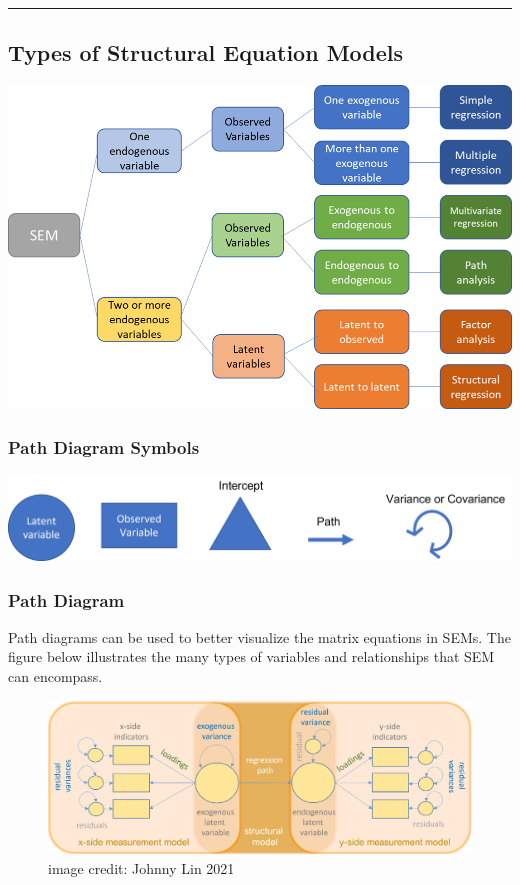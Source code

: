 \documentclass[
]{article}
\begin{document}
\begin{center}\rule{0.5\linewidth}{0.5pt}\end{center}

\hypertarget{types-of-structural-equation-models}{%
\subsection{Types of Structural Equation
Models}\label{types-of-structural-equation-models}}

\includegraphics{SEM Models.png}

\hypertarget{path-diagram-symbols}{%
\subsubsection{Path Diagram Symbols}\label{path-diagram-symbols}}

\includegraphics{Path.Diagram.Key.png}

\hypertarget{path-diagram}{%
\subsubsection{Path Diagram}\label{path-diagram}}

Path diagrams can be used to better visualize the matrix equations in
SEMs. The figure below illustrates the many types of variables and
relationships that SEM can encompass.

\begin{figure}
\centering
\includegraphics{UCLA.Path.Diagram.png}
\caption{image credit: Johnny Lin 2021}
\end{figure}
\end{document}
